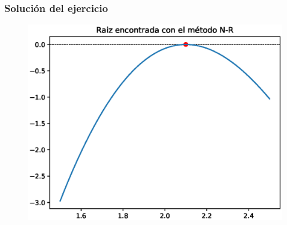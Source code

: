 \begin{frame}
\frametitle{Solución del ejercicio}
\begin{figure}
	\centering
	\includegraphics[scale=0.5]{Imagenes/Raiz_NR_02.eps}
\end{figure}
\end{frame}
